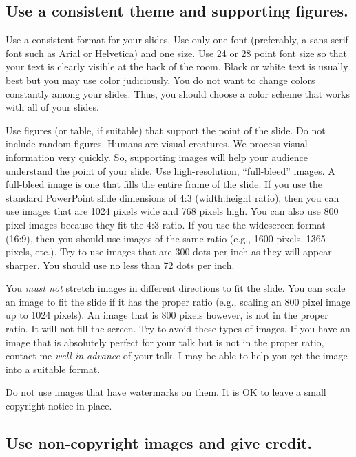 \documentclass[letterpaper]{memoir}
\newcommand{\insertslide}[2]{%
  \framebox{\texttt{[image: \#2]}}
}
\begin{document}
\subsection*{Use a consistent theme and supporting figures.}

\sidepar{\insertslide{9}{5_in_5_overview.pdf}}
Use a consistent format for your slides. Use only one font (preferably, a sans-serif font such as Arial or Helvetica) and one size. Use 24 or 28 point font size so that your text is clearly visible at the back of the room. Black or white text is usually best but you may use color judiciously. You do not want to change colors constantly among your slides. Thus, you should choose a color scheme that works with all of your slides. 

Use figures (or table, if suitable) that support the point of the slide. Do not include random figures. Humans are visual creatures. We process visual information very quickly. So, supporting images will help your audience understand the point of your slide.  Use high-resolution, “full-bleed” images. A full-bleed image is one that fills the entire frame of the slide.  If you use the standard PowerPoint slide dimensions of 4:3 (width:height ratio), then you can use images that are 1024 pixels wide and 768 pixels high. You can also use 800 pixel images because they fit the 4:3 ratio. If you use the widescreen format (16:9), then you should use images of the same ratio (e.g., 1600 pixels, 1365 pixels, etc.). Try to use images that are 300 dots per inch as they will appear sharper. You should use no less than 72 dots per inch.

You \emph{must not} stretch images in different directions to fit the slide. You can scale an image to fit the slide if it has the proper ratio (e.g., scaling an 800 pixel image up to 1024 pixels). An image that is 800 pixels however, is not in the proper ratio. It will not fill the screen.  Try to avoid these types of images.  If you have an image that is absolutely perfect for your talk but is not in the proper ratio, contact me \emph{well in advance} of your talk. I may be able to help you get the image into a suitable format.

Do not use images that have watermarks on them. It is OK to leave a small copyright notice in place.  

\subsection*{Use non-copyright images and give credit.}
\end{document}
